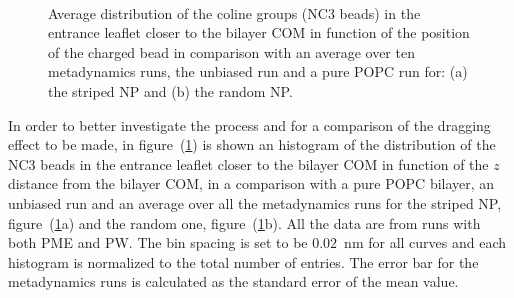\begin{figure}[h!p]
	\center
	\\%
	\caption{Average distribution of the coline groups (NC3 beads) in the entrance leaflet closer to the bilayer \acs{COM} in function of the position of the charged bead in comparison with an average over ten metadynamics runs, the unbiased run and a pure \acs{POPC} run for: (a) the striped \acs{NP} and (b) the random \acs{NP}.}
	\label{fig:NC3minDist}
\end{figure}

In order to better investigate the process and for a comparison of the dragging effect to be made, in figure~(\ref{fig:NC3minDist}) is shown an histogram of the distribution of the NC$3$ beads in the entrance leaflet closer to the bilayer \ac{COM} in function of the $z$ distance from the bilayer \ac{COM}, in a comparison with a pure \ac{POPC} bilayer, an unbiased run and an average over all the metadynamics runs for the striped \ac{NP}, figure~(\ref{fig:NC3minDist}a) and the random one, figure~(\ref{fig:NC3minDist}b). All the data are from runs with both \ac{PME} and \ac{PW}. The bin spacing is set to be $0.02$~nm for all curves and each histogram is normalized to the total number of entries. The error bar for the metadynamics runs is calculated as the standard error of the mean value.

